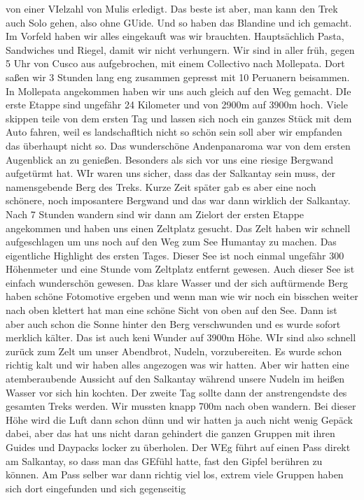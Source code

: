 \documentclass[11pt]{book}
\begin{document}
von einer VIelzahl von Mulis erledigt. Das beste ist aber, man kann den Trek auch Solo gehen, also ohne GUide. Und so haben das Blandine und ich gemacht. Im 
Vorfeld haben wir alles eingekauft was wir brauchten. Hauptsächlich Pasta, Sandwiches und Riegel, damit wir nicht verhungern. Wir sind in aller früh, gegen 5 
Uhr von Cusco aus aufgebrochen, mit einem Collectivo nach Mollepata. Dort saßen wir 3 Stunden lang eng zusammen gepresst mit 10 Peruanern beisammen. 
In Mollepata angekommen haben wir uns auch gleich auf den Weg gemacht. DIe erste Etappe sind ungefähr 24 Kilometer und von 2900m auf 3900m hoch. Viele 
skippen teile von dem ersten Tag und lassen sich noch ein ganzes Stück mit dem Auto fahren, weil es landschafltich nicht so schön sein soll aber wir empfanden 
das überhaupt nicht so. Das wunderschöne Andenpanaroma war von dem ersten Augenblick an zu genießen. Besonders als sich vor uns eine riesige Bergwand aufgetürmt 
hat. WIr waren uns sicher, dass das der Salkantay sein muss, der namensgebende Berg des Treks. Kurze Zeit später gab es aber eine noch schönere, noch imposantere 
Bergwand und das war dann wirklich der Salkantay. Nach 7 Stunden wandern sind wir dann am Zielort der ersten Etappe angekommen und haben uns einen Zeltplatz 
gesucht. Das Zelt haben wir schnell aufgeschlagen um uns noch auf den Weg zum See Humantay zu machen. Das eigentliche Highlight des ersten Tages. Dieser See 
ist noch einmal ungefähr 300 Höhenmeter und eine Stunde vom Zeltplatz entfernt gewesen. Auch dieser See ist einfach wunderschön gewesen. Das klare Wasser und 
der sich auftürmende Berg haben schöne Fotomotive ergeben und wenn man wie wir noch ein bisschen weiter nach oben klettert hat man eine schöne Sicht von oben 
auf den See. Dann ist aber auch schon die Sonne hinter den Berg verschwunden und es wurde sofort merklich kälter. Das ist auch keni Wunder auf 3900m Höhe. WIr 
sind also schnell zurück zum Zelt um unser Abendbrot, Nudeln, vorzubereiten. Es wurde schon richtig kalt und wir haben alles angezogen was wir hatten. Aber wir hatten
eine atemberaubende Aussicht auf den Salkantay während unsere Nudeln im heißen Wasser vor sich hin kochten. Der zweite Tag sollte dann der anstrengendste des 
gesamten Treks werden. Wir mussten knapp 700m nach oben wandern. Bei dieser Höhe wird die Luft dann schon dünn und wir hatten ja auch nicht wenig Gepäck dabei, 
aber das hat uns nicht daran gehindert die ganzen Gruppen mit ihren Guides und Daypacks locker zu überholen. Der WEg führt auf einen Pass direkt am Salkantay, so dass man 
das GEfühl hatte, fast den Gipfel berühren zu können. Am Pass selber war dann richtig viel los, extrem viele Gruppen haben sich dort eingefunden und sich gegenseitig 
\end{document}
